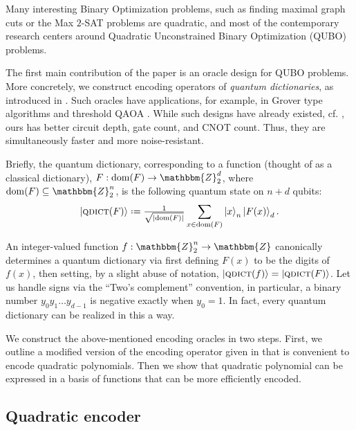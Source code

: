 \documentclass[reqno,10pt]{amsart}
\numberwithin{equation}{section}                %
\let\originalleft\left
\let\originalright\right
\renewcommand{\left}{\mathopen{}\mathclose\bgroup\originalleft}
\renewcommand{\right}{\aftergroup\egroup\originalright}
\def\({\mathopen{}\left(}
\def\){\right)\mathclose{}}
\newcommand*{\eqdef}{\mathrel{\vcenter{\baselineskip0.5ex \lineskiplimit0pt\hbox{.}\hbox{.}}}=}
\def\Z{\mathbbm{Z}}
\def\dom{\mathrm{dom}}
\def\qdict{\textsc{qdict}}
\begin{document}
Many interesting Binary Optimization problems, such as finding maximal graph cuts or the Max $2$-SAT problems are quadratic, and most of the contemporary research centers around Quadratic Unconstrained  Binary Optimization (QUBO) problems.

\medskip

The first main contribution of the paper is an oracle design for QUBO problems. More concretely, we construct encoding operators of \emph{quantum dictionaries}, as introduced in \cite{gilliam_foundational_2021}. Such oracles have applications, for example, in Grover type algorithms and threshold QAOA \cite{golden_threshold_2021}. While such designs have already existed, cf. \cite{gilliam_grover_2021}, ours has better circuit depth, gate count, and CNOT count. Thus, they are simultaneously faster and more noise-resistant.

Briefly, the quantum dictionary, corresponding to a function (thought of as a classical dictionary), $F: \dom \( F \) \rightarrow \Z_2^d$, where $\dom \( F \) \subseteq \Z_2^n$, is the following quantum state on $n + d$ qubits:
\begin{equation}
   \ket{\qdict \( F \)} \eqdef \tfrac{1}{\sqrt{\left| \dom \( F \) \right|}} \sum\limits_{x \in \dom \( F \)} \ket{x}_n \ket{F (x)}_d.
\end{equation}

An integer-valued function $f : \Z_2^n \rightarrow \Z$ canonically determines a quantum dictionary via first defining $F (x)$ to be the digits of $f (x)$, then setting, by a slight abuse of notation, $\ket{\qdict \( f \)} = \ket{\qdict \( F \)}$. Let us handle signs via the ``Two's complement'' convention, in particular, a binary number $y_0 y_1 \ldots y_{d - 1}$ is negative exactly when $y_0 = 1$. In fact, every quantum dictionary can be realized in this a way.

\smallskip

We construct the above-mentioned encoding oracles in two steps. First, we outline a modified version of the encoding operator given in \cite{gilliam_grover_2021} that is convenient to encode quadratic polynomials. Then we show that quadratic polynomial can be expressed in a basis of functions that can be more efficiently encoded.

\medskip

\subsection{Quadratic encoder}
\label{sec:quad}
\end{document}
